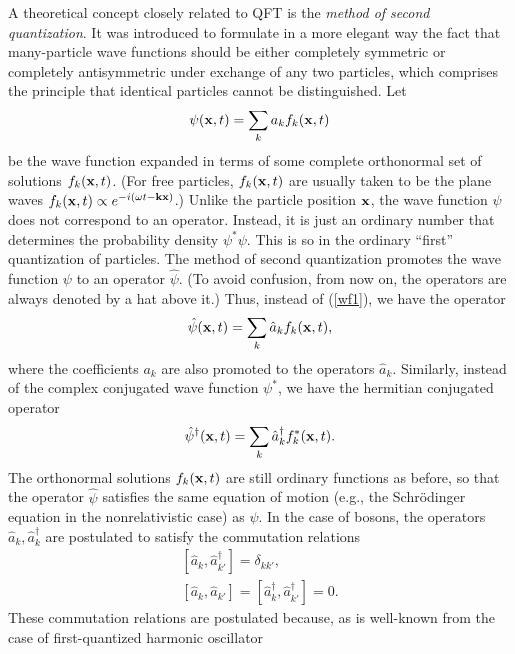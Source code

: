 \documentclass[12pt]{article}
\begin{document}
A theoretical concept closely related to QFT is the 
{\em method of second quantization}. It was introduced 
to formulate in a more elegant way the fact that 
many-particle wave functions should be either completely symmetric
or completely antisymmetric under exchange of any two particles, 
which comprises the principle that identical particles 
cannot be distinguished. Let
\begin{equation}\label{wf1}
\psi({\bf x},t)=\sum_k a_k f_k({\bf x},t)
\end{equation}
be the wave function expanded in terms of some 
complete orthonormal set of solutions $f_k({\bf x},t)$. 
(For free particles, $f_k({\bf x},t)$ are usually taken to 
be the plane waves $f_k({\bf x},t) \propto e^{-i(\omega t - {\bf kx})}$.)
Unlike the particle position ${\bf x}$, the wave function $\psi$
does not correspond to an operator. Instead, it is just 
an ordinary number that determines the probability density
$\psi^*\psi$. This is so in the ordinary ``first'' quantization 
of particles. The method of second quantization promotes 
the wave function $\psi$ to an operator $\hat{\psi}$. 
(To avoid confusion, from now on, 
the operators are always denoted by a hat above it.)
Thus, instead of (\ref{wf1}), we have the operator
\begin{equation}\label{wf2}
\hat{\psi}({\bf x},t)=\sum_k \hat{a}_k f_k({\bf x},t) ,
\end{equation}   
where the coefficients $a_k$ are also promoted to the 
operators $\hat{a}_k$. Similarly, instead of the complex conjugated 
wave function $\psi^*$, we have the hermitian conjugated 
operator
\begin{equation}\label{wf2*}              
\hat{\psi}^{\dagger}({\bf x},t)=\sum_k \hat{a}^{\dagger}_k f_k^*({\bf x},t) .
\end{equation}
The orthonormal solutions $f_k({\bf x},t)$ are still ordinary functions 
as before, so that the operator $\hat{\psi}$ satisfies the same equation of 
motion (e.g., the Schr\"odinger equation in the nonrelativistic case)
as $\psi$. In the case of bosons, 
the operators $\hat{a}_k,\hat{a}_k^{\dagger}$ are postulated to satisfy the 
commutation relations
\begin{eqnarray}\label{combos}
& [\hat{a}_k,\hat{a}_{k'}^{\dagger}]=\delta_{kk'} , & \nonumber \\
& [\hat{a}_k,\hat{a}_{k'}]=
[\hat{a}_k^{\dagger},\hat{a}_{k'}^{\dagger}]=0 .
\end{eqnarray}
These commutation relations are postulated because,
as is well-known from the case of first-quantized harmonic oscillator
\end{document}
